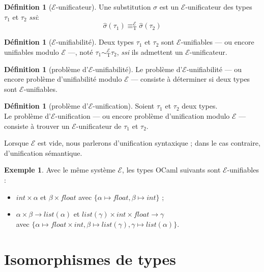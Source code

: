 \documentclass[a4paper]{report}
\theoremstyle{definition}
\newtheorem{definition}[theoreme]{Définition}
\newtheorem{exemple}[theoreme]{Exemple}
\newcommand{\ssi}{\textit{ssi}\xspace}
\newcommand{\E}{\mathscr{E}}
\newcommand{\T}{\mathrm{T}}
\begin{document}
\begin{definition}[$\E$-unificateur]
	Une substitution $\sigma$ est un $\E$-unificateur des types $\tau_1$ et $\tau_2$ \ssi :
	\[ \hat\sigma (\tau_1) \equiv_\T^\E \hat\sigma (\tau_2) \]
\end{definition}

\begin{definition}[$\E$-unifiabilité]
	Deux types $\tau_1$ et $\tau_2$ sont $\E$-unifiables — ou encore unifiables modulo $\E$ —, noté $\tau_1 \sim_\T^\E \tau_2$, \ssi ils admettent un $\E$-unificateur.
\end{definition}

\begin{definition}[problème d'$\E$-unifiabilité]
	Le problème d'$\E$-unifiabilité — ou encore problème d'unifiabilité modulo $\E$ — consiste à déterminer si deux types sont $\E$-unifiables.
\end{definition}

\begin{definition}[problème d'$\E$-unification]
	Soient $\tau_1$ et $\tau_2$ deux types. \\
	Le problème d'$\E$-unification — ou encore problème d'unification modulo $\E$ — consiste à trouver un $\E$-unificateur de $\tau_1$ et $\tau_2$.
\end{definition}

Lorsque $\E$ est vide, nous parlerons d'unification syntaxique ; dans le cas contraire, d'unification sémantique.

\begin{exemple}
	Avec le même système $\E$, les types OCaml suivants sont $\E$-unifiables :
	\begin{itemize}
		\item $int \times \alpha$ et $\beta \times float$ avec $\{ \alpha \mapsto float, \beta \mapsto int \}$ ;
		\item $\alpha \times \beta \rightarrow list (\alpha)$ et $list (\gamma) \times int \times float \rightarrow \gamma$ \\ avec $\{ \alpha \mapsto float \times int, \beta \mapsto list (\gamma), \gamma \mapsto list (\alpha) \}$.
	\end{itemize}
\end{exemple}


\section{Isomorphismes de types}
\end{document}
